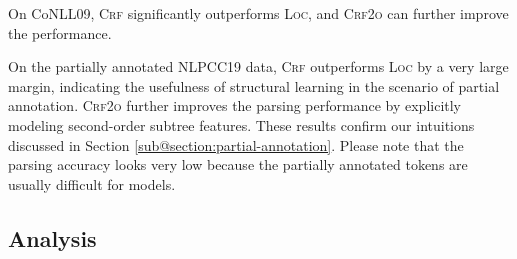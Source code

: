 On CoNLL09, \textsc{Crf} significantly outperforms \textsc{Loc},
and \textsc{Crf2o} can further improve the performance.

On the partially annotated NLPCC19 data, \textsc{Crf} outperforms \textsc{Loc} by a very large margin,
indicating the usefulness of structural learning in the scenario of partial annotation.
\textsc{Crf2o} further improves the parsing performance by explicitly modeling second-order subtree features.
These results confirm our intuitions discussed in Section \ref{sub@section:partial-annotation}.
Please note that the parsing accuracy looks very low because the partially annotated tokens
are usually difficult for models.







\subsection{Analysis}
\label{section:analysis}


